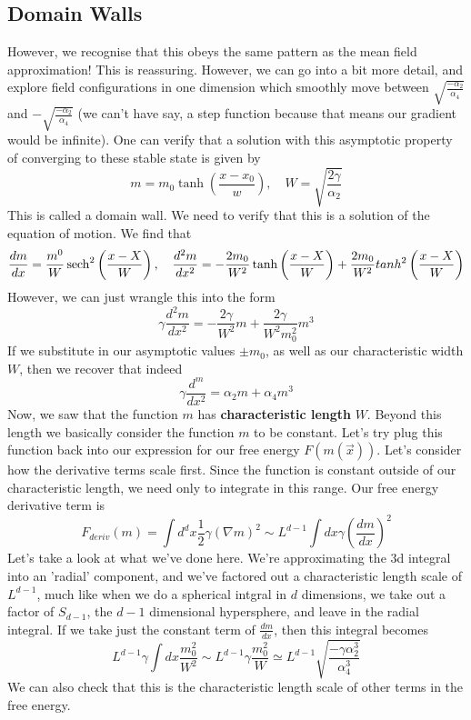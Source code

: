 \subsection{Domain Walls}
However, we recognise that this obeys the same pattern as the mean field approximation! This is reassuring. However, we can go into a bit more detail, and explore field configurations in one dimension which smoothly move between $ \sqrt{ \frac{  - \alpha_2 }{ \alpha_4 } }$ and $  - \sqrt{ \frac{  - \alpha_2 }{ \alpha_4 } } $ (we can't have say, a step function because that means our gradient would be infinite). One can verify that a solution with this asymptotic property of converging to these stable state is given by 
\[ 
m = m_0 \tanh \left( \frac{ x - x_0}{ w }  \right), \quad W = \sqrt{ \frac{ 2 \gamma }{ \alpha_2 } } 
\] This is called a domain wall. 
We need to verify that this is a solution of the equation of motion.
We find that 
\[	\frac{d m }{dx } = \frac{m^{0 }}{W} \sech^2 \left( \frac{x - X}{W} \right), \quad \frac{d^2 m }{dx^ 2 } =  - \frac{2m_0 }{W^ 2 } \tanh \left( \frac{x - X}{W} \right) 	+ \frac{2 m_0 }{W^ 2} tanh^2 \left( \frac{x - X }{W} \right)   	\] 
However, we can just wrangle this into the form 
\[
\gamma \frac{d^ 2 m }{dx^ 2 } = - \frac{2 \gamma }{W^ 2 }m  +  \frac{ 2 \gamma }{W^ 2 m_{0 }^2 }m ^ 3 
\] If we substitute in our asymptotic values $ \pm m_{0 }$, as well as our characteristic width $W$, then 
we recover that indeed 
\[
\gamma \frac{d^ m }{dx^ 2 } = \alpha_2 m + \alpha_4 m^{3}
\] 
Now, we saw that the function $m $ has \textbf{ characteristic length} $ W$. Beyond this length 
we basically consider the function $ m $ to be constant. Let's try 
plug this function back into our expression for our free energy $ F ( m ( \vec{x}) ) $. 
Let's consider how the derivative terms scale first. Since the function is constant outside of our characteristic length, 
we need only to integrate in this range. Our free energy derivative term is 
\[
F_{deriv } ( m ) = \int d^{d} x \frac{1}{2 } \gamma ( \nabla m )^ 2 \sim L^{d -1 } \int dx \gamma \left( \frac{ d m  }{dx} \right)^2  
\] Let's take a look at what we've done here. We're approximating the 3d integral 
into an 'radial' component, 
and we've factored out a characteristic length scale of $L^{d - 1}$, much like 
when we do a spherical intgral in $ d$ dimensions, we take out a factor of 
$ S_{d -1 } $, the $ d - 1$ dimensional hypersphere, and leave in the 
radial integral. 
If we take just the constant term of $\frac{d m  }{ dx }$, then this integral 
becomes 
\[
 L^{d - 1} \gamma \int dx \frac{m_0^2 }{W^ 2}  \sim  L^{d - 1} \gamma \frac{m_{0}^2 }{W} \simeq L^{d -1 }\sqrt{\frac{ - \gamma \alpha_2^3 }{\alpha_4^3 }}  
\] We can also check that 
this is the characteristic length scale of other terms in the free energy. 

